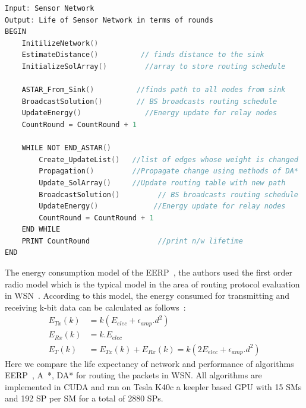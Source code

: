 \documentclass[a4paper]{article}
\begin{document}
\begin{lstlisting}[language=C, caption=EERP with DA*, label=WSNDA]
Input: Sensor Network
Output: Life of Sensor Network in terms of rounds
BEGIN
    InitilizeNetwork()
    EstimateDistance()          // finds distance to the sink
    InitializeSolArray()         //array to store routing schedule
    
    ASTAR_From_Sink()          //finds path to all nodes from sink
    BroadcastSolution()        // BS broadcasts routing schedule
    UpdateEnergy()               //Energy update for relay nodes
    CountRound = CountRound + 1
    
    WHILE NOT END_ASTAR()
        Create_UpdateList()   //list of edges whose weight is changed
        Propagation()         //Propagate change using methods of DA*  
        Update_SolArray()     //Update routing table with new path
        BroadcastSolution()         // BS broadcasts routing schedule
        UpdateEnergy()             //Energy update for relay nodes
        CountRound = CountRound + 1
    END WHILE
    PRINT CountRound                //print n/w lifetime 
END
\end{lstlisting}
The energy consumption model of the EERP~\cite{WSN2014}, the authors used the first order radio model which is the typical model in the area of routing protocol evaluation in WSN~\cite{WSN_energy}. According to this model, the energy consumed for transmitting and receiving k-bit data can be calculated as follows~\cite{WSN_energy}:
\begin{align*}
    E_{Tx}(k) &= k (E_{elec} + \epsilon_{amp}.d^2) \\
    E_{Rx}(k) &= k.E_{elec} \\
    E_T(k) &= E_{Tx}(k) + E_{Rx}(k) = k(2E_{elec} +\epsilon_{amp}.d^2)
\end{align*}
Here we compare the life expectancy of network and performance of algorithms EERP~\cite{WSN2014}, A~*\cite{A*}, DA* for routing the packets in WSN. All algorithms are implemented in CUDA and ran on Tesla K40c a keepler based GPU with 15 SMs and 192 SP per SM for a total of 2880 SPs.
\end{document}
